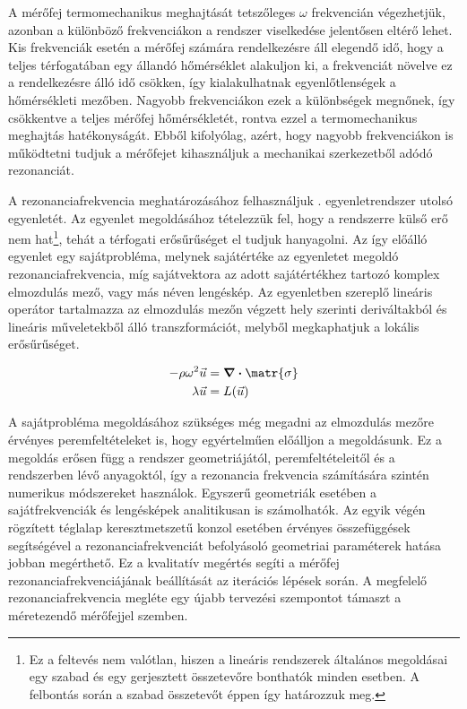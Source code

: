 A mérőfej termomechanikus meghajtását tetszőleges $\omega$ frekvencián végezhetjük, azonban a különböző frekvenciákon a rendszer viselkedése jelentősen eltérő lehet. Kis frekvenciák esetén a mérőfej számára rendelkezésre áll elegendő idő, hogy a teljes térfogatában egy állandó hőmérséklet alakuljon ki, a frekvenciát növelve ez a rendelkezésre álló idő csökken, így kialakulhatnak egyenlőtlenségek a hőmérsékleti mezőben. Nagyobb frekvenciákon ezek a különbségek megnőnek, így csökkentve a teljes mérőfej hőmérsékletét, rontva ezzel a termomechanikus meghajtás hatékonyságát. Ebből kifolyólag, azért, hogy nagyobb frekvenciákon is működtetni tudjuk a mérőfejet kihasználjuk a mechanikai szerkezetből adódó rezonanciát.

A rezonanciafrekvencia meghatározásához felhasználjuk . egyenletrendszer utolsó egyenletét. Az egyenlet megoldásához tételezzük fel, hogy a rendszerre külső erő nem hat\footnote{Ez a feltevés nem valótlan, hiszen a lineáris rendszerek általános megoldásai egy szabad és egy gerjesztett összetevőre bonthatók minden esetben. A felbontás során a szabad összetevőt éppen így határozzuk meg.}, tehát a térfogati erősűrűséget el tudjuk hanyagolni. Az így előálló egyenlet egy sajátprobléma, melynek sajátértéke az egyenletet megoldó rezonanciafrekvencia, míg sajátvektora az adott sajátértékhez tartozó komplex elmozdulás mező, vagy más néven lengéskép. Az egyenletben szereplő lineáris operátor tartalmazza az elmozdulás mezőn végzett hely szerinti deriváltakból és lineáris műveletekből álló transzformációt, melyből megkaphatjuk a lokális erősűrűséget.

\begin{equation}
    \begin{split}
        - \rho \omega^2 \vec{u} &= \div\matr{\sigma} \\
        \lambda \vec{u} &= L(\vec{u})
    \end{split}
\end{equation}

A sajátprobléma megoldásához szükséges még megadni az elmozdulás mezőre érvényes peremfeltételeket is, hogy egyértelműen előálljon a megoldásunk. Ez a megoldás erősen függ a rendszer geometriájától, peremfeltételeitől és a rendszerben lévő anyagoktól, így a rezonancia frekvencia számítására szintén numerikus módszereket használok. Egyszerű geometriák esetében a sajátfrekvenciák és lengésképek analitikusan is számolhatók\cite{beam}. Az egyik végén rögzített téglalap keresztmetszetű konzol esetében érvényes összefüggések\cite{cantilever} segítségével a rezonanciafrekvenciát befolyásoló geometriai paraméterek hatása jobban megérthető. Ez a kvalitatív megértés segíti a mérőfej rezonanciafrekvenciájának beállítását az iterációs lépések során. A megfelelő rezonanciafrekvencia megléte egy újabb tervezési szempontot támaszt a méretezendő mérőfejjel szemben.

